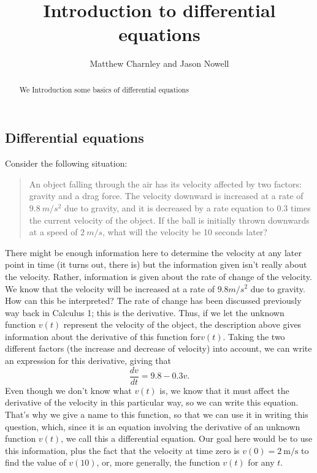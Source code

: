 \documentclass{ximera}
\title{Introduction to differential equations}
\author{Matthew Charnley and Jason Nowell}
\begin{document}
\begin{abstract}
    We Introduction some basics of differential equations
\end{abstract}
\maketitle

\label{introde:section}



\subsection{Differential equations}

Consider the following situation:
\begin{quote}
An object falling through the air has its velocity affected by two factors: gravity and a drag force. The velocity downward is increased at a rate of $9.8\ m/s^2$ due to gravity, and it is decreased by a rate equation to $0.3$ times the current velocity of the object. If the ball is initially thrown downwards at a speed of $2\ m/s$, what will the velocity be 10 seconds later?
\end{quote}

There might be enough information here to determine the velocity at any later point in time (it turns out, there is) but the information given isn't really about the velocity. Rather, information is given about the rate of change of the velocity. We know that the velocity will be increased at a rate of $9.8 m/s^2$ due to gravity. How can this be interpreted? The rate of change has been discussed previously way back in Calculus 1; this is the derivative. Thus, if we let the unknown function $v(t)$ represent the velocity of the object, the description above gives information about the derivative of this function for$v(t)$. Taking the two different factors (the increase and decrease of velocity) into account, we can write an expression for this derivative, giving that
\begin{equation*}
    \frac{dv}{dt} = 9.8 - 0.3v.
\end{equation*}
Even though we don't know what $v(t)$ is, we know that it must affect the derivative of the velocity in this particular way, so we can write this equation. That's why we give a name to this function, so that we can use it in writing this question, which, since it is an equation involving the derivative of an unknown function $v(t)$, we call this a differential equation. Our goal here would be to use this information, plus the fact that the velocity at time zero is $v(0) = 2\ \text{m/s}$ to find the value of $v(10)$, or, more generally, the function $v(t)$ for any $t$. 
\end{document}
